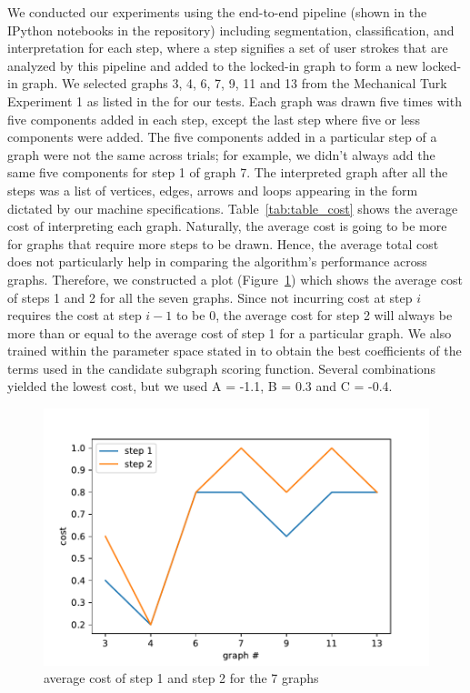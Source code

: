 We conducted our experiments using the end-to-end pipeline (shown in the IPython notebooks in the repository) including segmentation, classification, and interpretation for each step, where a step signifies a set of user strokes that are analyzed by this pipeline and added to the locked-in graph to form a new locked-in graph. We selected graphs 3, 4, 6, 7, 9, 11 and 13 from the Mechanical Turk Experiment 1 as listed in the \cite{daly2015hand} for our tests. Each graph was drawn five times with five components added in each step, except the last step where five or less components were added. The five components added in a particular step of a graph were not the same across trials; for example, we didn't always add the same five components for step 1 of graph 7. The interpreted graph after all the steps was a list of vertices, edges, arrows and loops appearing in the form dictated by our machine specifications. Table~\ref{tab:table_cost} shows the average cost of interpreting each graph. Naturally, the average cost is going to be more for graphs that require more steps to be drawn. Hence, the average total cost does not particularly help in comparing the algorithm's performance across graphs. Therefore, we constructed a plot (Figure~\ref{fig:cost_plot}) which shows the average cost of steps 1 and 2 for all the seven graphs. Since not incurring cost at step $i$ requires the cost at step $i-1$ to be 0, the average cost for step 2 will always be more than or equal to the average cost of step 1 for a particular graph. We also trained within the parameter space stated in \cite{daly2015hand} to obtain the best coefficients of the terms used in the candidate subgraph scoring function. Several combinations yielded the lowest cost, but we used A = -1.1, B = 0.3 and C = -0.4.

\begin{figure}[!htb]
    \centering
    \includegraphics[scale=0.55]{./img/cost_plot.pdf}
    \caption{average cost of step 1 and step 2 for the 7 graphs}
    \label{fig:cost_plot}
\end{figure}


